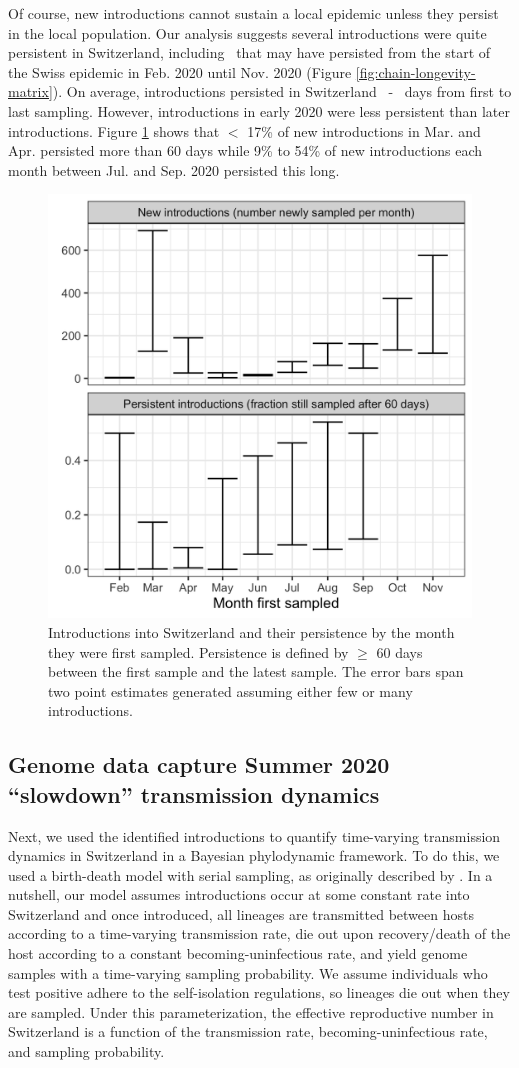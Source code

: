 \documentclass[9pt,twoside,lineno]{pnas-new} %
\begin{document}
Of course, new introductions cannot sustain a local epidemic unless they persist in the local population. Our analysis suggests several introductions were quite persistent in Switzerland, including \nspanningchainsfebnovmin\ that may have persisted from the start of the Swiss epidemic in Feb. 2020 until Nov. 2020 (Figure \ref{fig:chain-longevity-matrix}). On average, introductions persisted in Switzerland \meantimetolastsamplemax\ - \meantimetolastsamplemin\ days from first to last sampling. However, introductions in early 2020 were less persistent than later introductions. Figure \ref{fig:chain-longevity} shows that $<$ 17\% of new introductions in Mar. and Apr. persisted more than 60 days while  9\% to 54\% of new introductions each month between Jul. and Sep. 2020 persisted this long. 

\begin{figure}[H]
\centering
\includegraphics[width=.4\linewidth]{figures/introductions_and_persistance.png}
\caption{Introductions into Switzerland and their persistence by the month they were first sampled. Persistence is defined by $\geq$ 60 days between the first sample and the latest sample. The error bars span two point estimates generated assuming either few or many introductions.}
\label{fig:chain-longevity}
\end{figure}

\subsection{Genome data capture Summer 2020 ``slowdown'' transmission dynamics}

Next, we used the identified introductions to quantify time-varying transmission dynamics in Switzerland in a Bayesian phylodynamic framework. To do this, we used a birth-death model with serial sampling, as originally described by \cite{stadler_2010_bds}. In a nutshell, our model assumes introductions occur at some constant rate into Switzerland and once introduced, all lineages are transmitted between hosts according to a time-varying transmission rate, die out upon recovery/death of the host according to a constant becoming-uninfectious rate, and yield genome samples with a time-varying sampling probability. We assume individuals who test positive adhere to the self-isolation regulations, so lineages die out when they are sampled. Under this parameterization, the effective reproductive number in Switzerland is a function of the transmission rate, becoming-uninfectious rate, and sampling probability.
\end{document}
